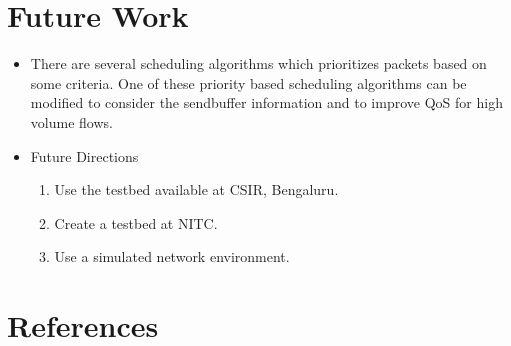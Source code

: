 \documentclass{beamer}
\begin{document}
\section{Future Work}
\begin{frame}{\insertsection}
\begin{itemize}
\item There are several scheduling algorithms which prioritizes packets based on some
criteria. One of these priority based scheduling algorithms can be modified to consider
the sendbuffer information and to improve QoS for high volume flows.
\item Future Directions
  \begin{enumerate}
    \item Use the testbed available at CSIR, Bengaluru.
    \item Create a testbed at NITC.
    \item Use a simulated network environment.
  \end{enumerate}
\end{itemize}
\end{frame}

\section{References}
\begin{frame}[allowframebreaks]
\frametitle<presentation>{\insertsection}
\nocite{*}
\printbibliography
\end{frame}
\end{document}
